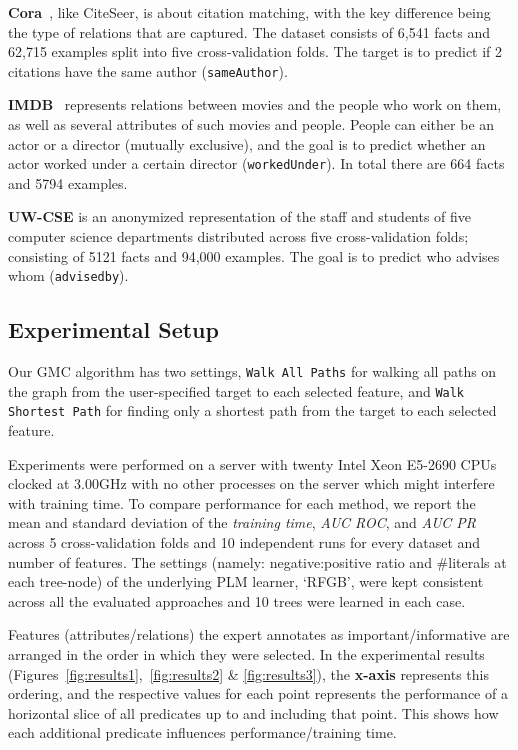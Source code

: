 \documentclass[sigconf]{acmart}
\begin{document}
\noindent \textbf{Cora}~\cite{poon07}, like CiteSeer, is about citation matching, with the key difference being the type of relations that are captured. The dataset consists of 6,541 facts and 62,715 examples split into five cross-validation folds. The target is to predict if 2 citations have the same author (\texttt{sameAuthor}).

\noindent \textbf{IMDB}~\cite{bottomupmln07} represents relations between movies and the people who work on them, as well as several attributes of such movies and people. People can either be an actor or a director (mutually exclusive), and the goal is to predict whether an actor worked under a certain director (\texttt{workedUnder}). In total there are 664 facts and 5794 examples.

\noindent \textbf{UW-CSE} is an anonymized representation of the staff and students of five computer science departments distributed across five cross-validation folds; consisting of 5121 facts and 94,000 examples. The goal is to predict who advises whom (\texttt{advisedby}).

\subsection{Experimental Setup}

Our \textsc{GMC} algorithm has two settings, \texttt{Walk All Paths} for walking all paths on the graph from the user-specified target to each selected feature, and \texttt{Walk Shortest Path} for finding only a shortest path from the target to each selected feature.

Experiments were performed on a server with twenty Intel Xeon E5-2690 CPUs clocked at 3.00GHz with no other processes on the server which might interfere with training time. To compare performance for each method, we report the mean and standard deviation of the \textit{training time}, \textit{AUC ROC}, and \textit{AUC PR} across 5 cross-validation folds and 10 independent runs for every dataset and number of features. The settings (namely: negative:positive ratio and \#literals at each tree-node) of the underlying PLM learner, `RFGB', were kept consistent across all the evaluated approaches and 10 trees were learned in each case.

Features (attributes/relations) the expert annotates as important/informative are arranged in the order in which they were selected. In the experimental results (Figures~\ref{fig:results1},~\ref{fig:results2} \& \ref{fig:results3}), the \textbf{x-axis} represents this ordering, and the respective values for each point represents the performance of a horizontal slice of all predicates up to and including that point. This shows how each additional predicate influences performance/training time.
\end{document}
